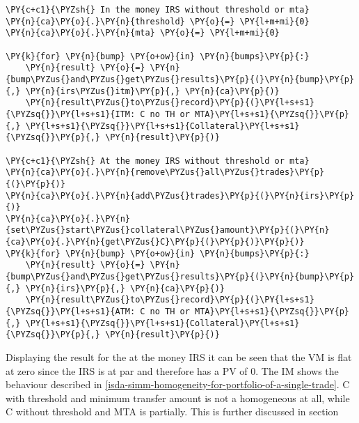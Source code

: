 \begin{tcolorbox}[breakable, size=fbox, boxrule=1pt, pad at break*=1mm,colback=cellbackground, colframe=cellborder]
\begin{Verbatim}[commandchars=\\\{\}]
\PY{c+c1}{\PYZsh{} In the money IRS without threshold or mta}
\PY{n}{ca}\PY{o}{.}\PY{n}{threshold} \PY{o}{=} \PY{l+m+mi}{0}
\PY{n}{ca}\PY{o}{.}\PY{n}{mta} \PY{o}{=} \PY{l+m+mi}{0}

\PY{k}{for} \PY{n}{bump} \PY{o+ow}{in} \PY{n}{bumps}\PY{p}{:}
    \PY{n}{result} \PY{o}{=} \PY{n}{bump\PYZus{}and\PYZus{}get\PYZus{}results}\PY{p}{(}\PY{n}{bump}\PY{p}{,} \PY{n}{irs\PYZus{}itm}\PY{p}{,} \PY{n}{ca}\PY{p}{)}
    \PY{n}{result\PYZus{}to\PYZus{}record}\PY{p}{(}\PY{l+s+s1}{\PYZsq{}}\PY{l+s+s1}{ITM: C no TH or MTA}\PY{l+s+s1}{\PYZsq{}}\PY{p}{,} \PY{l+s+s1}{\PYZsq{}}\PY{l+s+s1}{Collateral}\PY{l+s+s1}{\PYZsq{}}\PY{p}{,} \PY{n}{result}\PY{p}{)}

\PY{c+c1}{\PYZsh{} At the money IRS without threshold or mta}
\PY{n}{ca}\PY{o}{.}\PY{n}{remove\PYZus{}all\PYZus{}trades}\PY{p}{(}\PY{p}{)}
\PY{n}{ca}\PY{o}{.}\PY{n}{add\PYZus{}trades}\PY{p}{(}\PY{n}{irs}\PY{p}{)}
\PY{n}{ca}\PY{o}{.}\PY{n}{set\PYZus{}start\PYZus{}collateral\PYZus{}amount}\PY{p}{(}\PY{n}{ca}\PY{o}{.}\PY{n}{get\PYZus{}C}\PY{p}{(}\PY{p}{)}\PY{p}{)}
\PY{k}{for} \PY{n}{bump} \PY{o+ow}{in} \PY{n}{bumps}\PY{p}{:}
    \PY{n}{result} \PY{o}{=} \PY{n}{bump\PYZus{}and\PYZus{}get\PYZus{}results}\PY{p}{(}\PY{n}{bump}\PY{p}{,} \PY{n}{irs}\PY{p}{,} \PY{n}{ca}\PY{p}{)}
    \PY{n}{result\PYZus{}to\PYZus{}record}\PY{p}{(}\PY{l+s+s1}{\PYZsq{}}\PY{l+s+s1}{ATM: C no TH or MTA}\PY{l+s+s1}{\PYZsq{}}\PY{p}{,} \PY{l+s+s1}{\PYZsq{}}\PY{l+s+s1}{Collateral}\PY{l+s+s1}{\PYZsq{}}\PY{p}{,} \PY{n}{result}\PY{p}{)}
\end{Verbatim}
\end{tcolorbox}

    Displaying the result for the at the money IRS it can be seen that the
VM is flat at zero since the IRS is at par and therefore has a PV of 0.
The IM shows the behaviour described in
\ref{isda-simm-homogeneity-for-portfolio-of-a-single-trade}. C with
threshold and minimum transfer amount is not a homogeneous at all, while
C without threshold and MTA is partially. This is further discussed in
section 
 
            
            \begin{tcolorbox}[breakable, size=fbox, boxrule=.5pt, pad at break*=1mm, opacityfill=0]
    \begin{center}
    \end{center}
    { \hspace*{\fill} \\}
\end{tcolorbox}
    

